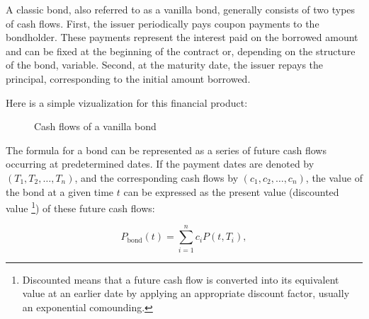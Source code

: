 \documentclass{article}
\begin{document}
A classic bond, also referred to as a vanilla bond, generally consists of two types of cash flows. First, the issuer periodically pays coupon payments to the bondholder. These payments represent the interest paid on the borrowed amount and can be fixed at the beginning of the contract or, depending on the structure of the bond, variable. Second, at the maturity date, the issuer repays the principal, corresponding to the initial amount borrowed.

Here is a simple vizualization for this financial product:


\begin{figure}[H]
    \centering
    \caption{Cash flows of a vanilla bond}
    \label{fig:bond_cashflows}
\end{figure}



The formula for a bond can be represented as a series of future cash flows occurring at predetermined dates. If the payment dates are denoted by $(T_1, T_2, \ldots, T_n)$, and the corresponding cash flows by $(c_1, c_2, \ldots, c_n)$, the value of the bond at a given time $t$ can be expressed as the present value (discounted value \footnote{Discounted means that a future cash flow is converted into its equivalent value at an earlier date by applying an appropriate discount factor, usually an exponential comounding.}) of these future cash flows:

\begin{equation}
P_{\text{bond}}(t)=\sum_{i=1}^{n} c_i P(t,T_i),
\end{equation}
\end{document}

